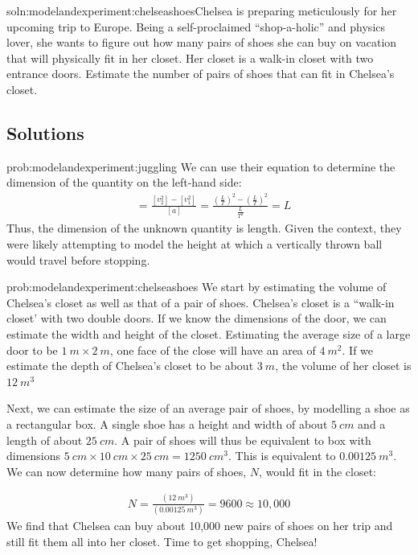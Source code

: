 \begin{problem}{soln:modelandexperiment:chelseashoes}{\label{prob:modelandexperiment:chelseashoes}Chelsea is preparing meticulously for her upcoming trip to Europe. Being a self-proclaimed ``shop-a-holic'' and physics lover, she wants to figure out how many pairs of shoes she can buy on vacation that will physically fit in her closet. Her closet is a walk-in closet with two entrance doors. Estimate the number of pairs of shoes that can fit in Chelsea's closet.}
\end{problem}

\subsection{Solutions}

\begin{solution}{prob:modelandexperiment:juggling}\label{soln:modelandexperiment:juggling}
We can use their equation to determine the dimension of the quantity on the left-hand side:
\begin{align*}
[?]&=\frac{[v_2^{2}]-[v_1^{2}]}{[a]}=\frac{\left(\frac{L}{T}\right)^{2}-\left(\frac{L}{T}\right)^2}{\frac{L}{T^{2}}}= L
\end{align*}
Thus, the dimension of the unknown quantity is length. Given the context, they were likely attempting to model the height at which a vertically thrown ball would travel before stopping.\end{solution}

\begin{solution}{prob:modelandexperiment:chelseashoes}\label{soln:modelandexperiment:chelseashoes}
We start by estimating the volume of Chelsea's closet as well as that of a pair of shoes. Chelsea's closet is a ``walk-in closet' with two double doors. If we know the dimensions of the door, we can estimate the width and height of the closet. Estimating the average size of a large door to be $\SI{1}{m}\times \SI{2}{m}$, one face of the close will have an area of $\SI{4}{m^2}$. If we estimate the depth of Chelsea's closet to be about $\SI{3}{m}$, the volume of her closet is $\SI{12}{m^3}$

Next, we can estimate the size of an average pair of shoes, by modelling a shoe as a rectangular box. A single shoe has a height and width of about $\SI{5}{cm}$ and a length of about $\SI{25}{cm}$. A pair of shoes will thus be equivalent to box with dimensions $\SI{5}{cm} \times \SI{10}{cm} \times \SI{25}{cm} = \SI{1250}{cm^3}$. This is equivalent to $\SI{0.00125}{m^3}$. We can now determine how many pairs of shoes, $N$, would fit in the closet:

\begin{align*}
N=\frac{(\SI{12}{m^3})}{(\SI{0.00125}{m^3})}= 9600\approx 10,000 
\end{align*}
We find that Chelsea can buy about 10,000 new pairs of shoes on her trip and still fit them all into her closet. Time to get shopping, Chelsea!
\end{solution}
